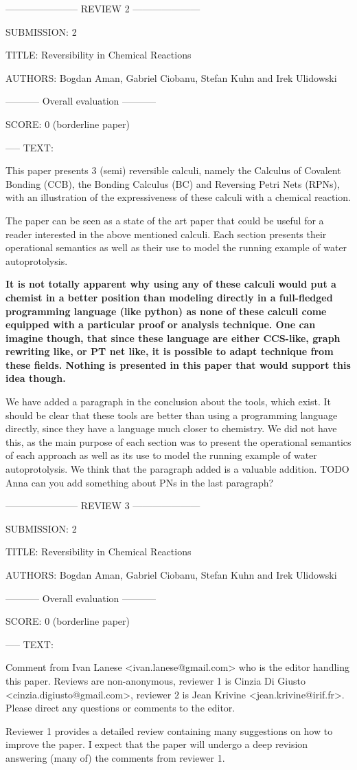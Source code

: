 \documentclass{article}
\begin{document}
----------------------- REVIEW 2 ---------------------

SUBMISSION: 2

TITLE: Reversibility in Chemical Reactions

AUTHORS: Bogdan Aman, Gabriel Ciobanu, Stefan Kuhn and Irek Ulidowski

----------- Overall evaluation -----------

SCORE: 0 (borderline paper)

----- TEXT:

This paper presents 3 (semi) reversible calculi, namely the Calculus of Covalent Bonding (CCB), the Bonding Calculus (BC) and Reversing Petri Nets (RPNs), with an illustration of the expressiveness of these calculi with a chemical reaction.

The paper can be seen as a state of the art paper that could be useful for a reader interested in the above mentioned calculi. Each section presents their operational semantics as well as their use to model the running example of water autoprotolysis.

\textbf{It is not totally apparent why using any of these calculi would put a chemist in a better position than modeling directly in a full-fledged programming language (like python) as none of these calculi come equipped with a particular proof or analysis technique.  One can imagine though, that since these language are either CCS-like, graph rewriting like, or PT net like, it is possible to adapt technique from these fields. Nothing is presented in this paper that would support this idea though.}

We have added a paragraph in the conclusion about the tools, which exist. It should be clear that these tools are better than using a programming language directly, since they have a language much closer to chemistry. We did not have this, as the main purpose of each section was to present the operational semantics of each approach as well as its use to model the running example of water autoprotolysis. We think that the paragraph added is a valuable addition. TODO Anna can you add something about PNs in the last paragraph?

----------------------- REVIEW 3 ---------------------

SUBMISSION: 2

TITLE: Reversibility in Chemical Reactions

AUTHORS: Bogdan Aman, Gabriel Ciobanu, Stefan Kuhn and Irek Ulidowski

----------- Overall evaluation -----------

SCORE: 0 (borderline paper)

----- TEXT:

Comment from Ivan Lanese <ivan.lanese@gmail.com> who is the editor handling this paper. Reviews are non-anonymous, reviewer 1 is Cinzia Di Giusto <cinzia.digiusto@gmail.com>, reviewer 2 is Jean Krivine <jean.krivine@irif.fr>. Please direct any questions or comments to the editor.

Reviewer 1 provides a detailed review containing many suggestions on how to improve the paper. I expect that the paper will undergo a deep revision answering (many of) the comments from reviewer 1.
\end{document}
